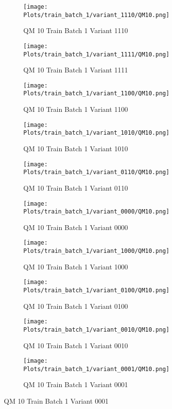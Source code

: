 \documentclass{DissertateFigs}
\begin{document}
\begin{figure}[t!]
    \begin{subfigure}{0.47\textwidth}
    \texttt{[image: Plots/train\_batch\_1/variant\_1110/QM10.png]}
    \caption{QM 10 Train Batch 1 Variant 1110}
    \end{subfigure}
    \begin{subfigure}{0.47\textwidth}
    \texttt{[image: Plots/train\_batch\_1/variant\_1111/QM10.png]}
    \caption{QM 10 Train Batch 1 Variant 1111}
    \end{subfigure}

\medskip

    \begin{subfigure}{0.47\textwidth}
    \texttt{[image: Plots/train\_batch\_1/variant\_1100/QM10.png]}
    \caption{QM 10 Train Batch 1 Variant 1100}
    \end{subfigure}
    \begin{subfigure}{0.47\textwidth}
    \texttt{[image: Plots/train\_batch\_1/variant\_1010/QM10.png]}
    \caption{QM 10 Train Batch 1 Variant 1010}
    \end{subfigure}

\medskip

    \begin{subfigure}{0.47\textwidth}
    \texttt{[image: Plots/train\_batch\_1/variant\_0110/QM10.png]}
    \caption{QM 10 Train Batch 1 Variant 0110}
    \end{subfigure}
    \begin{subfigure}{0.47\textwidth}
    \texttt{[image: Plots/train\_batch\_1/variant\_0000/QM10.png]}
    \caption{QM 10 Train Batch 1 Variant 0000}
    \end{subfigure}

\medskip

    \begin{subfigure}{0.47\textwidth}
    \texttt{[image: Plots/train\_batch\_1/variant\_1000/QM10.png]}
    \caption{QM 10 Train Batch 1 Variant 1000}
    \end{subfigure}
    \begin{subfigure}{0.47\textwidth}
    \texttt{[image: Plots/train\_batch\_1/variant\_0100/QM10.png]}
    \caption{QM 10 Train Batch 1 Variant 0100}
    \end{subfigure}

\medskip

    \begin{subfigure}{0.47\textwidth}
    \texttt{[image: Plots/train\_batch\_1/variant\_0010/QM10.png]}
    \caption{QM 10 Train Batch 1 Variant 0010}
    \end{subfigure}
    \begin{subfigure}{0.47\textwidth}
    \texttt{[image: Plots/train\_batch\_1/variant\_0001/QM10.png]}
    \caption{QM 10 Train Batch 1 Variant 0001}
    \end{subfigure}


\end{figure}
\end{document}
